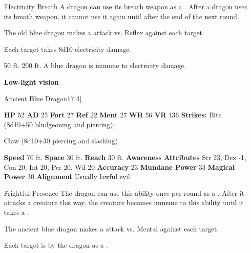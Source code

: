     \begin{freeability}{Electricity Breath}
      A dragon can use its breath weapon as a .
      After a dragon uses its breath weapon, it cannot use it again until after the end of the next round.
      \par The old blue dragon makes a  attack
        vs. Reflex against each target.
    
    \hit Each target takes 8d10 electricity damage.
    \end{freeability}
  
      
       50 ft.
     200 ft.
     A blue dragon is immune to electricity damage.
    \par\noindent\textbf{Low-light vision}
  

  \begin{monsubsection}{Ancient Blue Dragon}{17}[4]
    \vspace{-1em}\vspace{-1em}
    \vspace{0em}

    
    

    \begin{spellcontent}
      \begin{spelltargetinginfo}
        \pari \textbf{HP} 52 \monsep
          \textbf{AD} 25 \monsep
          \textbf{Fort} 27 \monsep
          \textbf{Ref} 22 \monsep
          \textbf{Ment} 27
        \pari \textbf{WR} 56 \monsep
        \textbf{VR} 136
        \pari \textbf{Strikes:}
            Bite  (8d10+50 bludgeoning and piercing);
\par Claw  (8d10+30 piercing and slashing)
      \end{spelltargetinginfo}
    \end{spellcontent}
    \begin{monsterfooter}
      \pari \textbf{Speed} 70 ft. \monsep
        \textbf{Space} 30 ft. \monsep
        \textbf{Reach} 30 ft.
      \pari \textbf{Awareness} 
      \pari \textbf{Attributes}
        Str 23, Dex -1,
        Con 20, Int 20,
        Per 20, Wil 20
      \pari \textbf{Accuracy} 23 \monsep
        \textbf{Mundane Power} 33 \monsep
      \textbf{Magical Power} 30
      \pari \textbf{Alignment} Usually lawful evil
    \end{monsterfooter}
  \end{monsubsection}
  \begin{freeability}{Frightful Presence}
      The dragon can use this ability once per round as a .
      After it attacks a creature this way, the creature becomes immune to this ability until it takes a .
      \par The ancient blue dragon makes a  attack
        vs. Mental against each target.
    
    \hit Each target is  by the dragon as a .
    \end{freeability}
  


